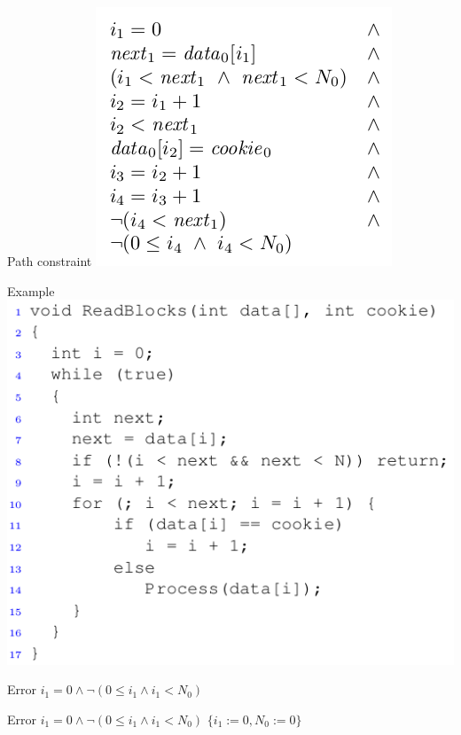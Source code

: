 \documentclass{beamer}
\begin{document}
\begin{frame}{Path constraint}
\includegraphics[scale=0.5]{path_constraint1.png}
\end{frame}

\begin{frame}{Example}
\includegraphics[scale=0.5]{example1.png}
\end{frame}

\begin{frame}{Error}
$i_1 = 0 \wedge \lnot (0 \le i_1 \wedge i_1 < N_0)$\newline
\end{frame}

\begin{frame}{Error}
$i_1 = 0 \wedge \lnot (0 \le i_1 \wedge i_1 < N_0)$\newline
$\{i_1 := 0, N_0 := 0\}$
\end{frame}
\end{document}

